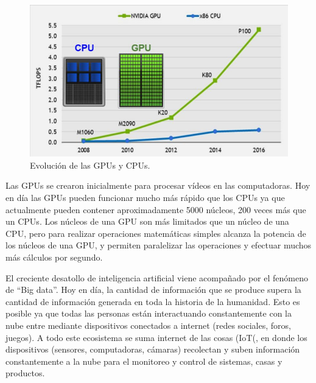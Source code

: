 \begin{figure}[ht]
	\centering
	\includegraphics[scale=.8]{./Figures/cpuGPU.jpg}
	\caption{Evolución de las GPUs y CPUs\protect\footnotemark.}
	\label{fig:cpuGPU}
\end{figure}


Las GPUs se crearon inicialmente para procesar vídeos en las computadoras.  Hoy en día las GPUs pueden funcionar mucho más rápido que los CPUs ya que actualmente pueden contener aproximadamente 5000 núcleos, 200 veces más que un CPUs. Los núcleos de una GPU son más limitados que un núcleo de una CPU, pero para realizar operaciones matemáticas simples alcanza la potencia de los núcleos de una GPU, y permiten paralelizar las operaciones y efectuar muchos más cálculos por segundo.

El creciente desatollo de inteligencia artificial viene acompañado por el fenómeno de ``Big data''. Hoy en día, la cantidad de información que se produce supera la cantidad de información generada en toda la historia de la humanidad. Esto es posible ya que todas las personas están interactuando constantemente con la nube entre mediante dispositivos conectados a internet (redes sociales, foros, juegos). A todo este ecosistema se suma internet de las cosas (IoT(, en donde los dispositivos (sensores, computadoras, cámaras) recolectan y suben información constantemente a la nube para el monitoreo y control de sistemas, casas y productos.

\newpage


